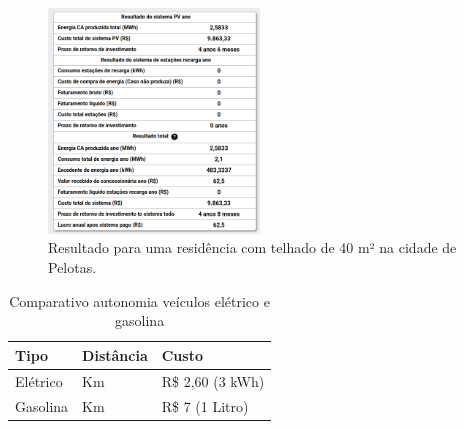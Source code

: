 \documentclass{beamer}
\begin{document}
\begin{frame}

\begin{figure}[H]
    \centering
    \includegraphics[width=0.5\textwidth]{./Figuras/casa_minha_1_2.png}
    \caption{Resultado para uma residência com telhado de 40 m² na cidade de Pelotas.}
   \label{fig:casa_minha_1_2}
\end{figure}

\end{frame}
\begin{frame}

\begin{table}[htbp]
    \caption{Comparativo autonomia veículos elétrico e gasolina}
        \begin{center}
            \begin{tabular}{ >{\centering\arraybackslash} m{3cm} >{\centering\arraybackslash} m{3cm} >{\centering\arraybackslash} m{3cm}  }
                \hline
                Tipo & Distância &  Custo \\ \hline %
                Elétrico & 15 Km & R\$  2,60 (3 kWh) \\
                Gasolina & 15 Km & R\$ 7 (1 Litro)\\ \hline
            \end{tabular}
        \end{center}
    \label{ev_gas}
\end{table}

\end{frame}
\end{document}
